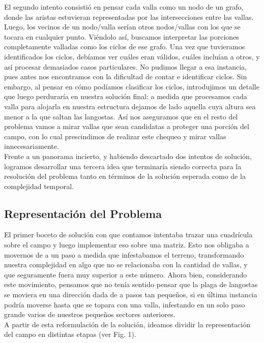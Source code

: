 \indent El segundo intento consistió en pensar cada valla como un nodo de un grafo, donde las aristas estuvieran representadas por las intersecciones entre las vallas. Luego, los vecinos de un nodo/valla serían otros nodos/vallas con los que se tocara en cualquier punto. Viéndolo así, buscamos interpretar las porciones completamente valladas como los ciclos de ese grafo. Una vez que tuvieramos identificados los ciclos, debíamos ver cuáles eran válidos, cuáles incluían a otros, y así procesar demasiados casos particulares. No pudimos llegar a esa instancia, pues antes nos encontramos con la dificultad de contar e identificar ciclos. Sin embargo, al pensar en cómo podíamos clasificar los ciclos, introdujimos un detalle que luego perduraría en nuestra solución final: a medida que procesamos cada valla para alojarla en nuestra estructura dejamos de lado aquella cuya altura sea menor a la que saltan las langostas. Así nos aseguramos que en el resto del problema vamos a mirar vallas que sean candidatas a proteger una porción del campo, con lo cual prescindimos de realizar este chequeo y mirar vallas innecesariamente.\\
\indent Frente a un panorama incierto, y habiendo descartado dos intentos de solución, logramos desarrollar una tercera idea que terminaría siendo correcta para la resolución del problema tanto en términos de la solución esperada como de la complejidad temporal. 

\subsection{Representación del Problema}

El primer boceto de solución con que contamos intentaba trazar una cuadrícula sobre el campo y luego implementar eso sobre una matriz. Esto nos obligaba a movernos de a un paso a medida que infestabamos el terreno, transformando nuestra complejidad en algo que no se relacionaba con la cantidad de vallas, y que seguramente fuera muy superior a este número. Ahora bien, considerando este movimiento, pensamos que no tenía sentido pensar que la plaga de langostas se moviera en una dirección dada de a pasos tan pequeños, si en última instancia podría moverse hasta que se topara con una valla, infestando en un solo paso grande varios de nuestros pequeños sectores anteriores.\\
\indent A partir de esta reformulación de la solución, ideamos dividir la representación del campo en distintas etapas (ver Fig. 1). 

